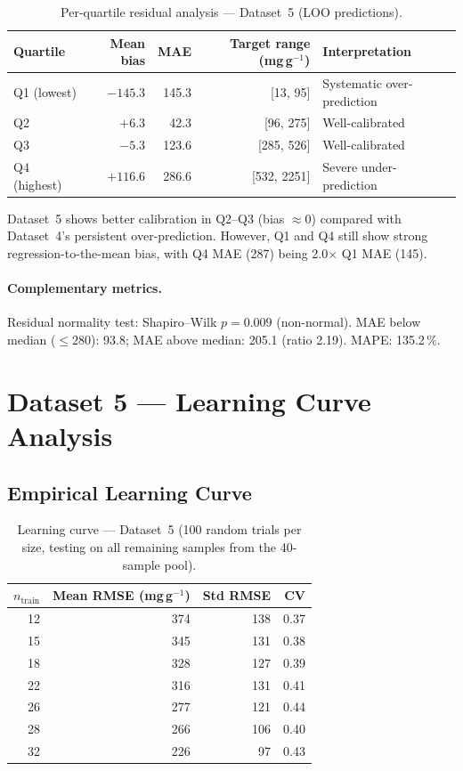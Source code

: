 \documentclass[12pt,a4paper]{article}
\begin{document}
\begin{table}[h]
\centering
\caption{Per-quartile residual analysis — Dataset~5 (LOO predictions).}
\label{tab:ds5_quartile_bias}
\small
\begin{tabular}{lrrrl}
\toprule
Quartile & Mean bias & MAE & Target range (mg\,g$^{-1}$) & Interpretation \\
\midrule
Q1 (lowest)  & $-145.3$ & 145.3 & [13, 95]     & Systematic over-prediction \\
Q2           & $+6.3$   &  42.3 & [96, 275]    & Well-calibrated \\
Q3           & $-5.3$   & 123.6 & [285, 526]   & Well-calibrated \\
Q4 (highest) & $+116.6$ & 286.6 & [532, 2251]  & Severe under-prediction \\
\bottomrule
\end{tabular}
\end{table}

\noindent Dataset~5 shows better calibration in Q2--Q3 (bias $\approx 0$)
compared with Dataset~4's persistent over-prediction.  However, Q1 and
Q4 still show strong regression-to-the-mean bias, with Q4 MAE (287) being
2.0$\times$ Q1 MAE (145).

\paragraph{Complementary metrics.}  Residual normality test:
Shapiro--Wilk $p = 0.009$ (non-normal).  MAE below median ($\leq 280$):
93.8; MAE above median: 205.1 (ratio 2.19).  MAPE: 135.2\,\%.

\section{Dataset 5 — Learning Curve Analysis}
\label{sec:ds5_learning}

\subsection{Empirical Learning Curve}

\begin{table}[h]
\centering
\caption{Learning curve — Dataset~5 (100 random trials per size,
  testing on all remaining samples from the 40-sample pool).}
\label{tab:ds5_learning_curve}
\begin{tabular}{rrrr}
\toprule
$n_\text{train}$ & Mean RMSE (mg\,g$^{-1}$) & Std RMSE & CV \\
\midrule
12 & 374 & 138 & 0.37 \\
15 & 345 & 131 & 0.38 \\
18 & 328 & 127 & 0.39 \\
22 & 316 & 131 & 0.41 \\
26 & 277 & 121 & 0.44 \\
28 & 266 & 106 & 0.40 \\
32 & 226 &  97 & 0.43 \\
\bottomrule
\end{tabular}
\end{table}
\end{document}
